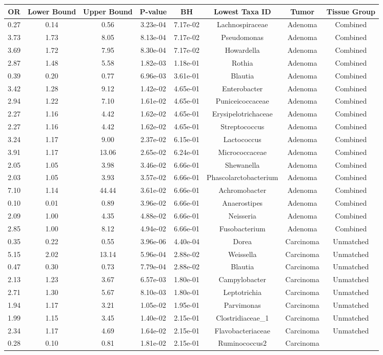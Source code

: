 \documentclass[12pt,]{article}
\begin{document}
\begin{longtable}[]{@{}cccccccc@{}}
\toprule
OR & Lower Bound & Upper Bound & P-value & BH & Lowest Taxa ID & Tumor &
Tissue Group\tabularnewline
\midrule
\endhead
0.27 & 0.14 & 0.56 & 3.23e-04 & 7.17e-02 & Lachnospiraceae & Adenoma &
Combined\tabularnewline
3.73 & 1.73 & 8.05 & 8.13e-04 & 7.17e-02 & Pseudomonas & Adenoma &
Combined\tabularnewline
3.69 & 1.72 & 7.95 & 8.30e-04 & 7.17e-02 & Howardella & Adenoma &
Combined\tabularnewline
2.87 & 1.48 & 5.58 & 1.82e-03 & 1.18e-01 & Rothia & Adenoma &
Combined\tabularnewline
0.39 & 0.20 & 0.77 & 6.96e-03 & 3.61e-01 & Blautia & Adenoma &
Combined\tabularnewline
3.42 & 1.28 & 9.12 & 1.42e-02 & 4.65e-01 & Enterobacter & Adenoma &
Combined\tabularnewline
2.94 & 1.22 & 7.10 & 1.61e-02 & 4.65e-01 & Puniceicoccaceae & Adenoma &
Combined\tabularnewline
2.27 & 1.16 & 4.42 & 1.62e-02 & 4.65e-01 & Erysipelotrichaceae & Adenoma
& Combined\tabularnewline
2.27 & 1.16 & 4.42 & 1.62e-02 & 4.65e-01 & Streptococcus & Adenoma &
Combined\tabularnewline
3.24 & 1.17 & 9.00 & 2.37e-02 & 6.15e-01 & Lactococcus & Adenoma &
Combined\tabularnewline
3.91 & 1.17 & 13.06 & 2.65e-02 & 6.24e-01 & Micrococcaceae & Adenoma &
Combined\tabularnewline
2.05 & 1.05 & 3.98 & 3.46e-02 & 6.66e-01 & Shewanella & Adenoma &
Combined\tabularnewline
2.03 & 1.05 & 3.93 & 3.57e-02 & 6.66e-01 & Phascolarctobacterium &
Adenoma & Combined\tabularnewline
7.10 & 1.14 & 44.44 & 3.61e-02 & 6.66e-01 & Achromobacter & Adenoma &
Combined\tabularnewline
0.10 & 0.01 & 0.89 & 3.96e-02 & 6.66e-01 & Anaerostipes & Adenoma &
Combined\tabularnewline
2.09 & 1.00 & 4.35 & 4.88e-02 & 6.66e-01 & Neisseria & Adenoma &
Combined\tabularnewline
2.85 & 1.00 & 8.12 & 4.94e-02 & 6.66e-01 & Fusobacterium & Adenoma &
Combined\tabularnewline
0.35 & 0.22 & 0.55 & 3.96e-06 & 4.40e-04 & Dorea & Carcinoma &
Unmatched\tabularnewline
5.15 & 2.02 & 13.14 & 5.96e-04 & 2.88e-02 & Weissella & Carcinoma &
Unmatched\tabularnewline
0.47 & 0.30 & 0.73 & 7.79e-04 & 2.88e-02 & Blautia & Carcinoma &
Unmatched\tabularnewline
2.13 & 1.23 & 3.67 & 6.57e-03 & 1.80e-01 & Campylobacter & Carcinoma &
Unmatched\tabularnewline
2.71 & 1.30 & 5.67 & 8.10e-03 & 1.80e-01 & Leptotrichia & Carcinoma &
Unmatched\tabularnewline
1.94 & 1.17 & 3.21 & 1.05e-02 & 1.95e-01 & Parvimonas & Carcinoma &
Unmatched\tabularnewline
1.99 & 1.15 & 3.45 & 1.40e-02 & 2.15e-01 & Clostridiaceae\_1 & Carcinoma
& Unmatched\tabularnewline
2.34 & 1.17 & 4.69 & 1.64e-02 & 2.15e-01 & Flavobacteriaceae & Carcinoma
& Unmatched\tabularnewline
0.28 & 0.10 & 0.81 & 1.81e-02 & 2.15e-01 & Ruminococcus2 & Carcinoma &

\end{longtable}
\end{document}
